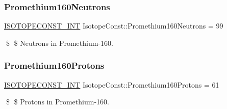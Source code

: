 \subsubsection{\texorpdfstring{Promethium160\+Neutrons}{Promethium160Neutrons}}
{\footnotesize\ttfamily \mbox{\hyperlink{group___isotope_const-_macros_ga5f18360b3e99483a35c32d789e62621c}{I\+S\+O\+T\+O\+P\+E\+C\+O\+N\+S\+T\+\_\+\+I\+NT}} Isotope\+Const\+::\+Promethium160\+Neutrons = 99}

\$ \$ Neutrons in Promethium-\/160. \mbox{\label{group___isotope_const-_promethium-_pm160_gaf5b260a0794faef2bc6ed622e1c646a5}} 
\subsubsection{\texorpdfstring{Promethium160\+Protons}{Promethium160Protons}}
{\footnotesize\ttfamily \mbox{\hyperlink{group___isotope_const-_macros_ga5f18360b3e99483a35c32d789e62621c}{I\+S\+O\+T\+O\+P\+E\+C\+O\+N\+S\+T\+\_\+\+I\+NT}} Isotope\+Const\+::\+Promethium160\+Protons = 61}

\$ \$ Protons in Promethium-\/160. 